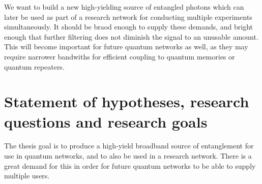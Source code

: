 \documentclass{article}
\theoremstyle{mytheoremstyle}
\theoremstyle{mytheoremstyle}
\theoremstyle{myproblemstyle}
\begin{document}
We want to build a new high-yielding source of entangled photons which can later be used as part of a research network
for conducting multiple experiments simultaneously. It should be braod enough to supply these demands, and bright enough
that further filtering does not diminish the signal to an unusable amount. This will become important for future quantum
networks as well, as they may require narrower bandwiths for efficient coupling to quantum memories or quantum repeaters.


\section{Statement of hypotheses, research questions and research goals}


The thesis goal is to produce a high-yield broadband source of entanglement for use in
quantum networks, and to also be used in a research network. There is a great demand for this in order for future 
quantum networks to be able to supply multiple users.

\end{document}
